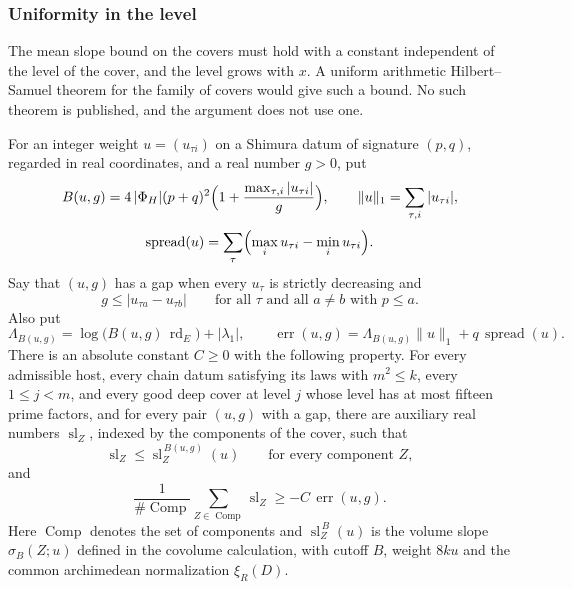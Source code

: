 \subsubsection{Uniformity in the level}\label{w3:sec:unif}

The mean slope bound on the covers must hold with a constant independent of the level of the cover, and the level grows with $x$. A uniform arithmetic Hilbert--Samuel theorem for the family of covers would give such a bound. No such theorem is published, and the argument does not use one.

\begin{hypothesis}\label{w3:W3:unif}
For an integer weight $u=(u_{\tau i})$ on a Shimura datum of signature
$(p,q)$, regarded in real coordinates, and a real number $g>0$, put
\[
  B(u,g)=4\,|\Phi_H|(p+q)^2
    \Bigl(1+\frac{\max_{\tau,i}|u_{\tau i}|}{g}\Bigr),\qquad
  \lVert u\rVert_1=\sum_{\tau,i}|u_{\tau i}|,
\]
\[
  \operatorname{spread}(u)=\sum_{\tau}
    \Bigl(\max_i u_{\tau i}-\min_i u_{\tau i}\Bigr).
\]
Say that $(u,g)$ has a gap when every $u_\tau$ is strictly decreasing and
\[
  g\leq |u_{\tau a}-u_{\tau b}|
  \qquad\text{for all $\tau$ and all $a\ne b$ with $p\leq a$}.
\]
Also put
\[
  \Lambda_{B(u,g)}=\log\bigl(B(u,g)\,\operatorname{rd}_E\bigr)
      +|\lambda_1|,
  \qquad
  \operatorname{err}(u,g)=\Lambda_{B(u,g)}\lVert u\rVert_1
      +q\,\operatorname{spread}(u).
\]
There is an absolute constant $C\geq0$ with the following property.  For
every admissible host, every chain datum satisfying its laws with $m^2\leq k$,
every $1\leq j<m$, and every good deep cover at level $j$ whose level has at
most fifteen prime factors, and for every pair $(u,g)$ with a gap, there are
auxiliary real numbers $\operatorname{sl}_Z$, indexed by the components of
the cover, such that
\[
  \operatorname{sl}_Z\leq \operatorname{sl}^{\,B(u,g)}_Z(u)
  \qquad\text{for every component $Z$},
\]
and
\[
  \frac1{\#\operatorname{Comp}}
    \sum_{Z\in\operatorname{Comp}}\operatorname{sl}_Z
  \geq -C\,\operatorname{err}(u,g).
\]
Here $\operatorname{Comp}$ denotes the set of components and
$\operatorname{sl}^{\,B}_Z(u)$ is the volume slope $\sigma_B(Z;u)$ defined in the covolume calculation, with cutoff $B$, weight $8ku$ and the common archimedean normalization $\xi_R(D)$.
\end{hypothesis}

